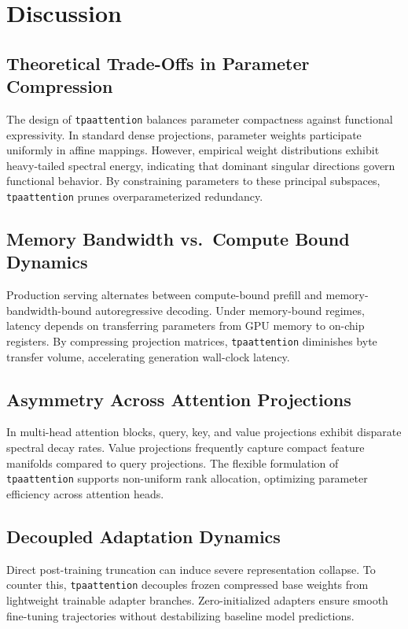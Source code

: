 \section{Discussion}

\subsection{Theoretical Trade-Offs in Parameter Compression}
The design of \texttt{tpaattention} balances parameter compactness against functional expressivity. In standard dense projections, parameter weights participate uniformly in affine mappings. However, empirical weight distributions exhibit heavy-tailed spectral energy, indicating that dominant singular directions govern functional behavior. By constraining parameters to these principal subspaces, \texttt{tpaattention} prunes overparameterized redundancy.

\subsection{Memory Bandwidth vs.\ Compute Bound Dynamics}
Production serving alternates between compute-bound prefill and memory-bandwidth-bound autoregressive decoding. Under memory-bound regimes, latency depends on transferring parameters from GPU memory to on-chip registers. By compressing projection matrices, \texttt{tpaattention} diminishes byte transfer volume, accelerating generation wall-clock latency.

\subsection{Asymmetry Across Attention Projections}
In multi-head attention blocks, query, key, and value projections exhibit disparate spectral decay rates. Value projections frequently capture compact feature manifolds compared to query projections. The flexible formulation of \texttt{tpaattention} supports non-uniform rank allocation, optimizing parameter efficiency across attention heads.

\subsection{Decoupled Adaptation Dynamics}
Direct post-training truncation can induce severe representation collapse. To counter this, \texttt{tpaattention} decouples frozen compressed base weights from lightweight trainable adapter branches. Zero-initialized adapters ensure smooth fine-tuning trajectories without destabilizing baseline model predictions.

